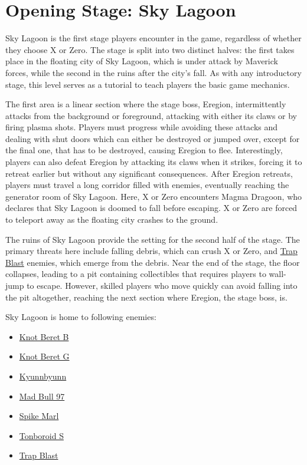 \section{Opening Stage: Sky Lagoon}\label{X4:intro_stage}
Sky Lagoon is the first stage players encounter in the game, regardless of whether they choose X or Zero. The stage is split into two distinct halves: the first takes place in the floating city of Sky Lagoon, which is under attack by Maverick forces, while the second in the ruins after the city's fall. As with any introductory stage, this level serves as a tutorial to teach players the basic game mechanics.

The first area is a linear section where the stage boss, Eregion, intermittently attacks from the background or foreground, attacking with either its claws or by firing plasma shots. Players must progress while avoiding these attacks and dealing with shut doors which can either be destroyed or jumped over, except for the final one, that has to be destroyed, causing Eregion to flee. Interestingly, players can also defeat Eregion by attacking its claws when it strikes, forcing it to retreat earlier but without any significant consequences. After Eregion retreats, players must travel a long corridor filled with enemies, eventually reaching the generator room of Sky Lagoon. Here, X or Zero encounters Magma Dragoon, who declares that Sky Lagoon is doomed to fall before escaping. X or Zero are forced to teleport away as the floating city crashes to the ground.

The ruins of Sky Lagoon provide the setting for the second half of the stage. The primary threats here include falling debris, which can crush X or Zero, and \hyperlink{enem:Trap_Blast}{Trap Blast} enemies, which emerge from the debris. Near the end of the stage, the floor collapses, leading to a pit containing collectibles that requires players to wall-jump to escape. However, skilled players who move quickly can avoid falling into the pit altogether, reaching the next section where Eregion, the stage boss, is.


Sky Lagoon is home to following enemies:
\begin{itemize}
	\item \hyperlink{enem:Knot_Beret_B}{Knot Beret B}
	\item \hyperlink{enem:Knot_Beret_G}{Knot Beret G}
	\item \hyperlink{enem:Kyunnbyunn}{Kyunnbyunn}
	\item \hyperlink{enem:Mad_Bull_97}{Mad Bull 97}
	\item \hyperlink{enem:Spike_Marl}{Spike Marl}
	\item \hyperlink{enem:Tonboroid_S}{Tonboroid S}
	\item \hyperlink{enem:Trap_Blast}{Trap Blast}
\end{itemize}
